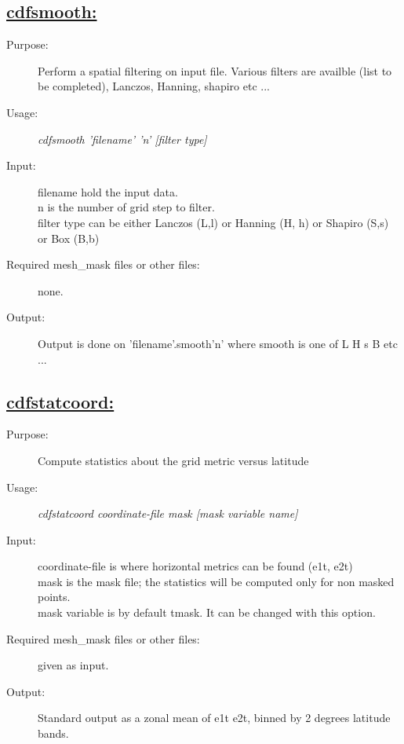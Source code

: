 \documentclass[a4paper,11pt]{article}
\begin{document}
\subsection*{\underline{cdfsmooth:}}
\begin{description}
\item[Purpose:] Perform a spatial filtering on input file. Various filters are availble (list to be completed), Lanczos, Hanning, shapiro etc ...
\item[Usage:] {\em cdfsmooth 'filename' 'n' [filter type] }
\item[Input:]  filename hold the input data. \\
         n is the number of grid step to filter. \\
         filter type can be either Lanczos (L,l) or Hanning (H, h) or Shapiro (S,s) or Box (B,b)
\item[Required mesh\_mask files or other files:] none.
\item[Output:] Output is done on 'filename'.smooth'n' where smooth is one of L H s B etc ...
\end{description}


\subsection*{\underline{cdfstatcoord:}}
\begin{description}
\item[Purpose:] Compute statistics about the grid metric versus latitude
\item[Usage:] {\em cdfstatcoord coordinate-file mask [mask variable name] }
\item[Input:]  coordinate-file is where horizontal metrics can be found (e1t, e2t) \\
               mask is the mask file; the statistics will be computed only for non masked points. \\
               mask variable is by default tmask. It can be changed with this option.
\item[Required mesh\_mask files or other files:] given as input.
\item[Output:] Standard output as a zonal mean of e1t e2t, binned by 2 degrees latitude bands.
\end{description}



\newpage

\tableofcontents
\printindex
\end{document}
